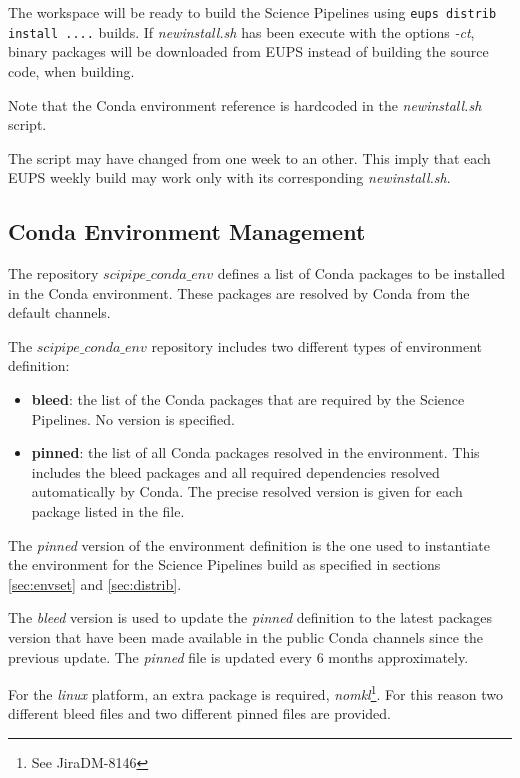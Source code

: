 The workspace will be ready to build the Science Pipelines using \texttt{eups distrib install ....} builds. If \textit{newinstall.sh} has been execute with the options \textit{-ct}, binary packages will be downloaded from EUPS instead of building the source code, when building.

Note that the Conda environment reference is hardcoded in the \textit{newinstall.sh} script.

The script may have changed from one week to an other.
This imply that each EUPS weekly build may work only with its corresponding \textit{newinstall.sh}.


\subsection{Conda Environment Management} \label{sec:condaenv}

The repository $scipipe\_conda\_env$ defines a list of Conda packages to be installed in the Conda environment.
These packages are resolved by Conda from the default channels.

The $scipipe\_conda\_env$ repository includes two different types of environment definition:

\begin{itemize}
\item {\bf bleed}: the list of the Conda packages that are required by the Science Pipelines. No version is specified.
\item {\bf pinned}: the list of all Conda packages resolved in the environment. This includes the bleed packages and all required dependencies resolved automatically by Conda. The precise resolved version is given for each package listed in the file.
\end{itemize}

The \textit{pinned} version of the environment definition is the one used to instantiate the environment for the Science Pipelines build as specified in sections \ref{sec:envset} and \ref{sec:distrib}.

The \textit{bleed} version is used to update the \textit{pinned} definition to the latest packages version that have been made available in the public Conda channels since the previous update.
The \textit{pinned} file is updated every 6 months approximately.

For the \textit{linux} platform, an extra package is required, \textit{nomkl}\footnote{See Jira{DM-8146}}. For this reason two different bleed files and two different pinned files are provided.


